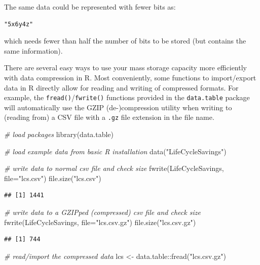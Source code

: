 \documentclass[
  12pt,
]{style/krantz}
\newenvironment{Shaded}{\begin{snugshade}}{\end{snugshade}}
\newcommand{\AttributeTok}[1]{\textcolor[rgb]{0.77,0.63,0.00}{#1}}
\newcommand{\CommentTok}[1]{\textcolor[rgb]{0.56,0.35,0.01}{\textit{#1}}}
\newcommand{\FunctionTok}[1]{\textcolor[rgb]{0.00,0.00,0.00}{#1}}
\newcommand{\NormalTok}[1]{#1}
\newcommand{\OtherTok}[1]{\textcolor[rgb]{0.56,0.35,0.01}{#1}}
\newcommand{\SpecialCharTok}[1]{\textcolor[rgb]{0.00,0.00,0.00}{#1}}
\newcommand{\StringTok}[1]{\textcolor[rgb]{0.31,0.60,0.02}{#1}}
\begin{document}
The same data could be represented with fewer bits as:

\begin{verbatim}
"5x6y4z"
\end{verbatim}

which needs fewer than half the number of bits to be stored (but contains the same information).

There are several easy ways to use your mass storage capacity more efficiently with data compression in R. Most conveniently, some functions to import/export data in R directly allow for reading and writing of compressed formats. For example, the \texttt{fread()}/\texttt{fwrite()} functions provided in the \texttt{data.table} package will automatically use the GZIP (de-)compression utility when writing to (reading from) a CSV file with a \texttt{.gz} file extension in the file name.

\begin{Shaded}
\begin{Highlighting}[]
\CommentTok{\# load packages}
\FunctionTok{library}\NormalTok{(data.table)}

\CommentTok{\# load example data from basic R installation}
\FunctionTok{data}\NormalTok{(}\StringTok{"LifeCycleSavings"}\NormalTok{)}

\CommentTok{\# write data to normal csv file and check size}
\FunctionTok{fwrite}\NormalTok{(LifeCycleSavings, }\AttributeTok{file=}\StringTok{"lcs.csv"}\NormalTok{)}
\FunctionTok{file.size}\NormalTok{(}\StringTok{"lcs.csv"}\NormalTok{)}
\end{Highlighting}
\end{Shaded}

\begin{verbatim}
## [1] 1441
\end{verbatim}

\begin{Shaded}
\begin{Highlighting}[]
\CommentTok{\# write data to a GZIPped (compressed) csv file and check size}
\FunctionTok{fwrite}\NormalTok{(LifeCycleSavings, }\AttributeTok{file=}\StringTok{"lcs.csv.gz"}\NormalTok{)}
\FunctionTok{file.size}\NormalTok{(}\StringTok{"lcs.csv.gz"}\NormalTok{)}
\end{Highlighting}
\end{Shaded}

\begin{verbatim}
## [1] 744
\end{verbatim}

\begin{Shaded}
\begin{Highlighting}[]
\CommentTok{\# read/import the compressed data}
\NormalTok{lcs }\OtherTok{\textless{}{-}}\NormalTok{ data.table}\SpecialCharTok{::}\FunctionTok{fread}\NormalTok{(}\StringTok{"lcs.csv.gz"}\NormalTok{)}
\end{Highlighting}
\end{Shaded}
\end{document}
